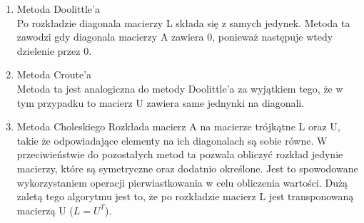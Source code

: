 \documentclass[11pt, a4paper]{article}
\begin{document}
\begin{enumerate}

\item Metoda Doolittle'a\\
Po rozkładzie diagonala macierzy L składa się z samych jedynek. Metoda ta zawodzi gdy diagonala macierzy A zawiera \begin{math} 0 \end{math}, ponieważ następuje wtedy dzielenie przez \begin{math} 0 \end{math}.

\item Metoda Croute'a\\
Metoda ta jest analogiczna do metody Doolittle'a za wyjątkiem tego, że w tym przypadku to macierz U zawiera same jednynki na diagonali.

\item Metoda Choleskiego
Rozkłada macierz A na macierze trójkątne L oraz U, takie że odpowiadające elementy na ich diagonalach są sobie równe. W przeciwieństwie do pozostałych metod ta pozwala obliczyć rozkład jedynie macierzy, które są symetryczne oraz dodatnio określone. Jest to spowodowane wykorzystaniem operacji pierwiastkowania w celu obliczenia wartości. Dużą zaletą tego algorytmu jest to, że po rozkładzie macierz L jest transponowaną macierzą U (\begin{math} L = U^T \end{math}).

\end{enumerate}
\end{document}
